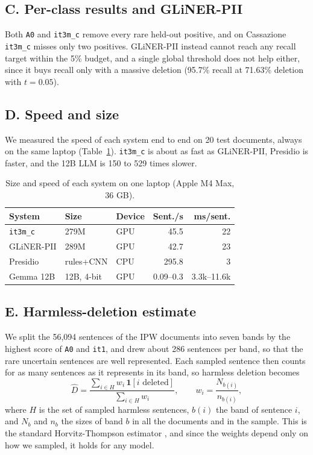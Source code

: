 \documentclass[11pt]{article}
\begin{document}
\subsection*{C. Per-class results and GLiNER-PII}
Both \texttt{A0} and \texttt{it3m\_c} remove every rare held-out positive, and on Cassazione \texttt{it3m\_c} misses only two positives. GLiNER-PII instead cannot reach any recall target within the 5\% budget, and a single global threshold does not help either, since it buys recall only with a massive deletion (95.7\% recall at 71.63\% deletion with $t=0.05$).

\subsection*{D. Speed and size}
We measured the speed of each system end to end on 20 test documents, always on the same laptop (Table~\ref{tab:speed}). \texttt{it3m\_c} is about as fast as GLiNER-PII, Presidio is faster, and the 12B LLM is 150 to 529 times slower.

\begin{table}[t]
\centering\footnotesize
\setlength{\tabcolsep}{3pt}
\begin{tabular}{lllrr}
\toprule
System & Size & Device & Sent./s & ms/sent. \\
\midrule
\texttt{it3m\_c} & 279M & GPU & 45.5 & 22 \\
GLiNER-PII & 289M & GPU & 42.7 & 23 \\
Presidio & rules+CNN & CPU & 295.8 & 3 \\
Gemma 12B & 12B, 4-bit & GPU & 0.09--0.3 & 3.3k--11.6k \\
\bottomrule
\end{tabular}
\caption{Size and speed of each system on one laptop (Apple M4 Max, 36 GB).}
\label{tab:speed}
\end{table}

\subsection*{E. Harmless-deletion estimate}
We split the 56,094 sentences of the IPW documents into seven bands by the highest score of \texttt{A0} and \texttt{it1}, and drew about 286 sentences per band, so that the rare uncertain sentences are well represented. Each sampled sentence then counts for as many sentences as it represents in its band, so harmless deletion becomes
{
\begin{equation}
\hat{D}=\frac{\sum_{i\in H} w_i\,\mathbf{1}[\text{$i$ deleted}]}{\sum_{i\in H} w_i},\qquad w_i=\frac{N_{b(i)}}{n_{b(i)}},
\end{equation}}
where $H$ is the set of sampled harmless sentences, $b(i)$ the band of sentence $i$, and $N_b$ and $n_b$ the sizes of band $b$ in all the documents and in the sample. This is the standard Horvitz-Thompson estimator \citep{horvitz1952generalization}, and since the weights depend only on how we sampled, it holds for any model.
\end{document}
